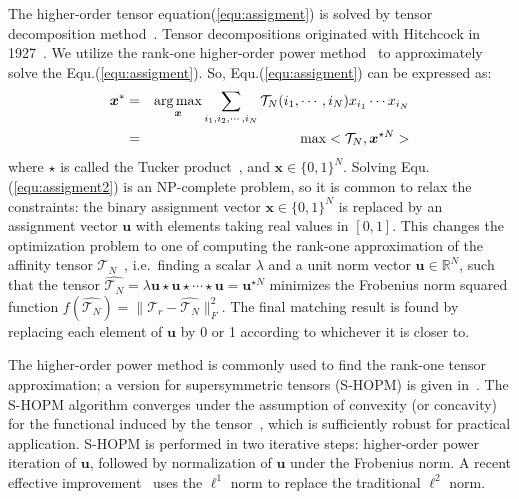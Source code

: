 The higher-order tensor equation(\ref{equ:assigment}) is solved by tensor decomposition method~\cite{Kolda08}.
Tensor decompositions originated with Hitchcock in 1927~\cite{Hitchcock27}.
We utilize the rank-one higher-order power method~\cite{Lathauwer95} to approximately solve the Equ.(\ref{equ:assigment}).
So, Equ.(\ref{equ:assigment}) can be expressed as:
\begin{eqnarray}
\label{equ:assigment2}
{\boldsymbol{x}}^* &=& \operatorname*{arg\,max}_{\boldsymbol{x}} \sum_{i_1,i_2,\cdots,i_N} \mathcal{T}_N(i_1,\cdots,i_N) x_{i_1} \cdots x_{i_N} \nonumber\\
&=& \max <\mathcal{T}_N, \boldsymbol{x}^{\star N}>
\end{eqnarray}
where $\star$ is called the Tucker product~\cite{Kofidis02}, and $\boldsymbol{x} \in \{0,1\}^{N}$.
Solving Equ.(\ref{equ:assigment2}) is an NP-complete problem,
so it is common to relax the constraints:
the binary assignment vector $\boldsymbol{x}\in \{0,1\}^{N}$ is replaced by an assignment vector $\boldsymbol{u}$ with elements taking real values in $[0,1]$.
This changes the optimization problem to one of computing the rank-one approximation of the affinity tensor $\mathcal{T}_N$~\cite{Kofidis02},
i.e.\ finding a scalar $\lambda$ and a unit norm vector $\boldsymbol{u}\in \mathbb{R}^{N}$,
such that the tensor $\hat{\mathcal{T}_N} = \lambda \boldsymbol{u}\star \boldsymbol{u} \star\cdots \star \boldsymbol{u}=\boldsymbol{u}^{\star N}$ minimizes the Frobenius norm squared function $f(\hat{\mathcal{T}_N})=\lVert \mathcal{T}_r-\hat{\mathcal{T}_N} \lVert^2_F$.
The final matching result is found by replacing each element of $\boldsymbol{u}$ by 0 or 1 according to whichever it is closer to.

The higher-order power method is commonly used to find the rank-one tensor approximation;
a version for supersymmetric tensors (S-HOPM) is given in~\cite{Kofidis02}.
The S-HOPM algorithm converges under the assumption of convexity (or concavity) for the functional induced by the tensor~\cite{Kofidis02},
which is sufficiently robust for practical application.
S-HOPM is performed in two iterative steps: higher-order power iteration of $\boldsymbol{u}$, followed by normalization of $\boldsymbol{u}$ under the Frobenius norm.
A recent effective improvement~\cite{Duchenne09} uses the $\mathcal{\ell}^1$ norm to replace the traditional $\mathcal{\ell}^2$ norm.

